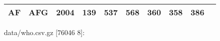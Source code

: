 \documentclass[]{article}
\newenvironment{Shaded}{\begin{snugshade}}{\end{snugshade}}
\newcommand{\StringTok}[1]{\textcolor[rgb]{0.31,0.60,0.02}{#1}}
\newcommand{\SpecialStringTok}[1]{\textcolor[rgb]{0.31,0.60,0.02}{#1}}
\newcommand{\VariableTok}[1]{\textcolor[rgb]{0.00,0.00,0.00}{#1}}
\newcommand{\AttributeTok}[1]{\textcolor[rgb]{0.77,0.63,0.00}{#1}}
\newcommand{\NormalTok}[1]{#1}
\begin{document}
\begin{longtable}[]{@{}llllllllll@{}}
\begin{minipage}[t]{0.04\columnwidth}
AF\strut
\end{minipage} & \begin{minipage}[t]{0.04\columnwidth}\raggedright\strut
AFG\strut
\end{minipage} & \begin{minipage}[t]{0.04\columnwidth}\raggedright\strut
2004\strut
\end{minipage} & \begin{minipage}[t]{0.08\columnwidth}\raggedright\strut
139\strut
\end{minipage} & \begin{minipage}[t]{0.09\columnwidth}\raggedright\strut
537\strut
\end{minipage} & \begin{minipage}[t]{0.09\columnwidth}\raggedright\strut
568\strut
\end{minipage} & \begin{minipage}[t]{0.09\columnwidth}\raggedright\strut
360\strut
\end{minipage} & \begin{minipage}[t]{0.09\columnwidth}\raggedright\strut
358\strut
\end{minipage} & \begin{minipage}[t]{0.09\columnwidth}\raggedright\strut
386\strut
\end{minipage}\tabularnewline
\bottomrule
\end{longtable}

\begin{Shaded}
\end{Shaded}

data/who.csv.gz {[}76046 8{]}:
\end{document}
